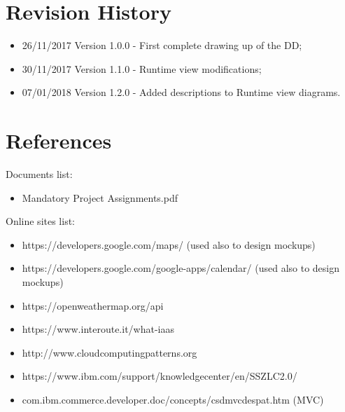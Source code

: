 \section{Revision History}
\begin{itemize}
\item	26/11/2017 Version 1.0.0 - First complete drawing up of the DD;
\item	30/11/2017 Version 1.1.0 - Runtime view modifications;
\item	07/01/2018 Version 1.2.0 - Added descriptions to Runtime view diagrams.
\end{itemize}
%
%
\section{References}
Documents list:
\begin{itemize}
\item Mandatory Project Assignments.pdf
\end{itemize}
Online sites list:
\begin{itemize}
\item	https://developers.google.com/maps/ (used also to design mockups)
\item	https://developers.google.com/google-apps/calendar/ (used also to design mockups)
\item	https://openweathermap.org/api
\item	https://www.interoute.it/what-iaas
\item	http://www.cloudcomputingpatterns.org
\item	https://www.ibm.com/support/knowledgecenter/en/SSZLC2.0/
\item	com.ibm.commerce.developer.doc/concepts/csdmvcdespat.htm (MVC)
\end{itemize}
%
%
